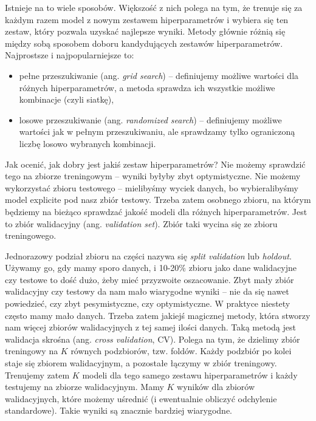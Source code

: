 \documentclass{myclass}
\begin{document}
Istnieje na to wiele sposobów. Większość z nich polega na tym, że trenuje się za każdym razem model
z nowym zestawem hiperparametrów i wybiera się ten zestaw, który pozwala uzyskać najlepsze wyniki.
Metody głównie różnią się między sobą sposobem doboru kandydujących zestawów hiperparametrów.
Najprostsze i najpopularniejsze to:
\begin{itemize}
\item pełne przeszukiwanie (ang. \emph{grid search}) -- definiujemy możliwe wartości dla różnych
hiperparametrów, a metoda sprawdza ich wszystkie możliwe kombinacje (czyli siatkę),

\item losowe przeszukiwanie (ang. \emph{randomized search}) -- definiujemy możliwe wartości jak w
pełnym przeszukiwaniu, ale sprawdzamy tylko ograniczoną liczbę losowo wybranych kombinacji.
\end{itemize}

Jak ocenić, jak dobry jest jakiś zestaw hiperparametrów? Nie możemy sprawdzić tego na zbiorze
treningowym -- wyniki byłyby zbyt optymistyczne. Nie możemy wykorzystać zbioru testowego --
mielibyśmy wyciek danych, bo wybieralibyśmy model explicite pod nasz zbiór testowy. Trzeba zatem
osobnego zbioru, na którym będziemy na bieżąco sprawdzać jakość modeli dla różnych hiperparametrów.
Jest to zbiór walidacyjny (ang. \emph{validation set}). Zbiór taki wycina się ze zbioru
treningowego.

Jednorazowy podział zbioru na części nazywa się \emph{split validation} lub \emph{holdout}. Używamy
go, gdy mamy sporo danych, i 10-20\% zbioru jako dane walidacyjne czy testowe to dość dużo, żeby
mieć przyzwoite oszacowanie. Zbyt mały zbiór walidacyjny czy testowy da nam mało wiarygodne wyniki
-- nie da się nawet powiedzieć, czy zbyt pesymistyczne, czy optymistyczne. W praktyce niestety
często mamy mało danych. Trzeba zatem jakiejś magicznej metody, która stworzy nam więcej zbiorów
walidacyjnych z tej samej ilości danych. Taką metodą jest walidacja skrośna (ang. \emph{cross
validation}, CV). Polega na tym, że dzielimy zbiór treningowy na \(K\) równych podzbiorów, tzw.
foldów. Każdy podzbiór po kolei staje się zbiorem walidacyjnym, a pozostałe łączymy w zbiór
treningowy. Trenujemy zatem \(K\) modeli dla tego samego zestawu hiperparametrów i każdy testujemy
na zbiorze walidacyjnym. Mamy \(K\) wyników dla zbiorów walidacyjnych, które możemy uśrednić (i
ewentualnie obliczyć odchylenie standardowe). Takie wyniki są znacznie bardziej wiarygodne.
\end{document}
